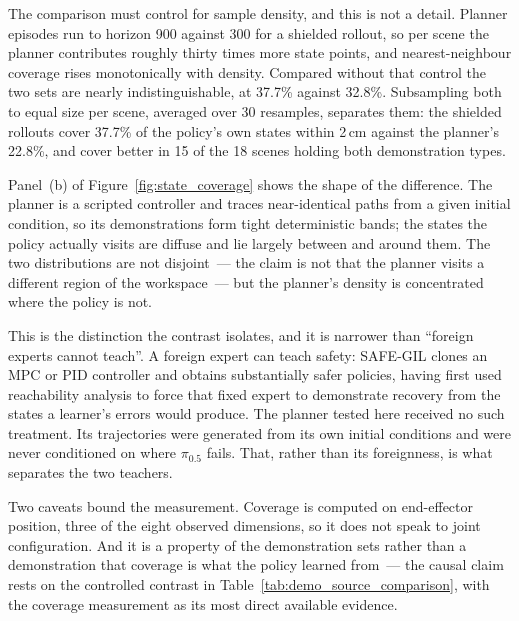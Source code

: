 The comparison must control for sample density, and this is not a detail. Planner episodes run to
horizon 900 against 300 for a shielded rollout, so per scene the planner contributes roughly thirty
times more state points, and nearest-neighbour coverage rises monotonically with density. Compared
without that control the two sets are nearly indistinguishable, at 37.7\% against 32.8\%.
Subsampling both to equal size per scene, averaged over 30 resamples, separates them: the shielded
rollouts cover 37.7\% of the policy's own states within 2\,cm against the planner's 22.8\%, and
cover better in 15 of the 18 scenes holding both demonstration types.

Panel~(b) of Figure~\ref{fig:state_coverage} shows the shape of the difference. The planner is a
scripted controller and traces near-identical paths from a given initial condition, so its
demonstrations form tight deterministic bands; the states the policy actually visits are diffuse
and lie largely between and around them. The two distributions are not disjoint~--- the claim is
not that the planner visits a different region of the workspace~--- but the planner's density is
concentrated where the policy is not.

This is the distinction the contrast isolates, and it is narrower than ``foreign experts cannot
teach''. A foreign expert can teach safety: SAFE-GIL clones an MPC or PID controller and obtains
substantially safer policies, having first used reachability analysis to force that fixed expert to
demonstrate recovery from the states a learner's errors would produce. The planner tested here
received no such treatment. Its trajectories were generated from its own initial conditions and
were never conditioned on where $\pi_{0.5}$ fails. That, rather than its foreignness, is what
separates the two teachers.

Two caveats bound the measurement. Coverage is computed on end-effector position, three of the
eight observed dimensions, so it does not speak to joint configuration. And it is a property of the
demonstration sets rather than a demonstration that coverage is what the policy learned from~---
the causal claim rests on the controlled contrast in Table~\ref{tab:demo_source_comparison}, with
the coverage measurement as its most direct available evidence.

